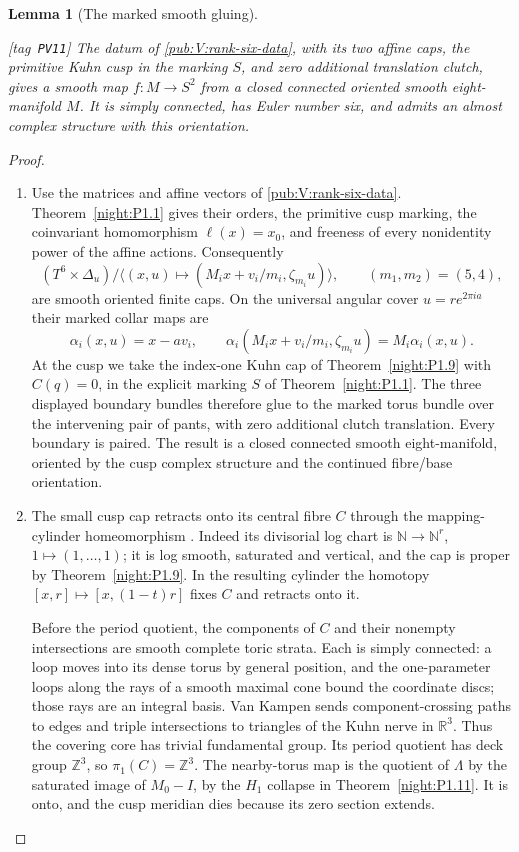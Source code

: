 \documentclass[11pt,a4paper]{article}
\numberwithin{equation}{section}
\newtheorem{lemma}[lemma]{Lemma}
\theoremstyle{definition}
\newcommand{\StatementRecord}[4]{{\upshape\footnotesize[tag~\texttt{#3}]}\enspace\ignorespaces}
\begin{document}
\begin{lemma}[The marked smooth gluing]
\hypertarget{tag-PV11}{}\label{pub:V:smooth-gluing}
\StatementRecord{pub:V:smooth-gluing}{proved}{PV11}{\cref{night:P1.1}, \cref{night:P1.9}, \cref{night:P1.11}; \cite[Theorem 4.1.1 and Lemmas 4.1.2--4.1.3, pp.~480--482]{ffAchingerOgus20}}
The datum of \cref{pub:V:rank-six-data}, with its two affine caps,
the primitive Kuhn cusp in the marking $S$, and zero additional
translation clutch, gives a smooth map $f:M\to S^2$ from a
closed connected oriented smooth eight-manifold $M$. It is simply
connected, has Euler number six,
and admits an almost complex structure with this orientation.
\end{lemma}
\begin{proof}
\begin{enumerate}[label=\arabic*.,leftmargin=*]
\item Use the matrices and affine vectors of \cref{pub:V:rank-six-data}.
Theorem~\ref{night:P1.1} gives their orders, the primitive cusp
marking, the coinvariant homomorphism $\ell(x)=x_0$, and freeness of
every nonidentity power of the affine actions. Consequently
\[
 (T^6\times\Delta_u)/
 \langle(x,u)\mapsto(M_ix+v_i/m_i,\zeta_{m_i}u)\rangle,
 \qquad (m_1,m_2)=(5,4),
\]
are smooth oriented finite caps. On the universal angular cover
$u=r e^{2\pi ia}$ their marked collar maps are
\[
 \alpha_i(x,u)=x-av_i,
 \qquad
 \alpha_i(M_ix+v_i/m_i,\zeta_{m_i}u)=M_i\alpha_i(x,u).
\]
At the cusp we take the index-one Kuhn cap of
Theorem~\ref{night:P1.9} with $C(q)=0$, in the explicit marking
$S$ of Theorem~\ref{night:P1.1}. The three displayed boundary bundles
therefore glue to the marked torus bundle over the intervening pair
of pants, with zero additional clutch translation. Every boundary
is paired. The result is a closed connected smooth eight-manifold,
oriented by the cusp complex structure and the continued fibre/base
orientation.

\item The small cusp cap retracts onto its central fibre $C$ through
the mapping-cylinder homeomorphism
\cite[Theorem 4.1.1 and Lemmas 4.1.2--4.1.3, pp.~480--482]{ffAchingerOgus20}.
Indeed its divisorial log chart is
$\mathbb N\to\mathbb N^r$, $1\mapsto(1,\ldots,1)$; it is log smooth,
saturated and vertical, and the cap is proper by
Theorem~\ref{night:P1.9}. In the resulting cylinder the homotopy
$[x,r]\mapsto[x,(1-t)r]$ fixes $C$ and retracts onto it.

Before the period quotient, the components of $C$ and their
nonempty intersections are smooth complete toric strata. Each is
simply connected: a loop moves into its dense torus by general
position, and the one-parameter loops along the rays of a smooth
maximal cone bound the coordinate discs; those rays are an integral
basis. Van Kampen sends component-crossing paths to edges and triple
intersections to triangles of the Kuhn nerve in $\mathbb R^3$.
Thus the covering core has trivial fundamental group. Its period
quotient has deck group $\mathbb Z^3$, so $\pi_1(C)=\mathbb Z^3$.
The nearby-torus map is the quotient of $\Lambda$ by the saturated
image of $M_0-I$, by the $H_1$ collapse in
Theorem~\ref{night:P1.11}. It is onto, and the cusp meridian dies
because its zero section extends.


\end{enumerate}
\end{proof}
\end{document}
